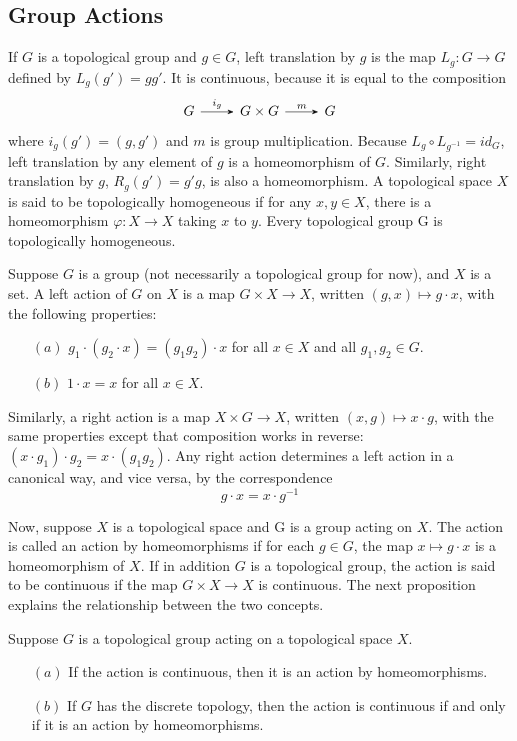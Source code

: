 \subsection{Group Actions}
If $G$ is a topological group and $g\in G$, left translation by $g$ is the map $L_g:G\to G$ defined by $L_g(g')=gg'$. It is continuous, because it is equal to the composition
\[\begin{tikzcd}
G\ar[-{Stealth},r,"i_g"] & G\times G\ar[-{Stealth},r,"m"] &G
\end{tikzcd}\]
where $i_g(g')=(g,g')$ and $m$ is group multiplication. Because $L_g\circ L_{g^{-1}}=id_G$, left translation by any element of $g$ is a homeomorphism of $G$. Similarly, right translation by $g$, $R_g(g')=g'g$, is also a homeomorphism. A topological space $X$ is said to be topologically homogeneous if for any $x,y\in  X$, there is a homeomorphism $\varphi:X\to X$ taking $x$ to $y$. Every topological group G is topologically homogeneous.
\begin{definition}
Suppose $G$ is a group (not necessarily a topological group for now), and $X$ is a set. A left action of $G$ on $X$ is a map $G\times X\to X$, written $(g,x)\mapsto g\cdot x$, with the
following properties:
\begin{itemize}
\item[$(a)$]$g_1\cdot (g_2\cdot x)=(g_1g_2)\cdot x$ for all $x\in X$ and all $g_1,g_2\in G$.
\item[$(b)$]$1\cdot x=x$ for all $x\in X$.
\end{itemize}
Similarly, a right action is a map $X\times G\to X$, written $(x,g)\mapsto x\cdot g$, with the same properties except that composition works in reverse: $(x\cdot g_1)\cdot g_2=x\cdot(g_1g_2)$. Any right action determines a left action in a canonical way, and vice versa, by the correspondence
\[g\cdot x=x\cdot g^{-1}\]
\end{definition}
Now, suppose $X$ is a topological space and G is a group acting on $X$. The action is called an action by homeomorphisms if for each $g\in G$, the map $x\mapsto g\cdot x$ is a homeomorphism of $X$. If in addition $G$ is a topological group, the action is said to be continuous if the map
$G\times X\to X$ is continuous. The next proposition explains the relationship between the two concepts.
\begin{proposition}
Suppose $G$ is a topological group acting on a topological space $X$.
\begin{itemize}
\item[$(a)$]If the action is continuous, then it is an action by homeomorphisms.
\item[$(b)$]If $G$ has the discrete topology, then the action is continuous if and only if it is an action by homeomorphisms.
\end{itemize}
\end{proposition}
